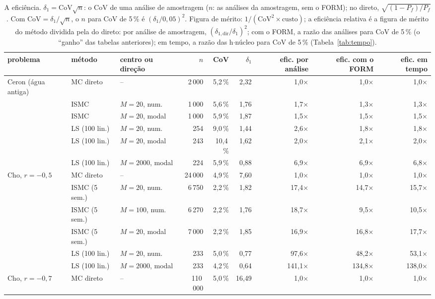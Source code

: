 \begin{landscape}
\begin{table}[H]\centering\footnotesize
\caption{A eficiência. $\delta_1 = \mathrm{CoV}\sqrt{n}$: o CoV de uma análise de amostragem ($n$: as análises da amostragem, sem o FORM); no direto, $\sqrt{(1 - P_f)/P_f}$. Com $\mathrm{CoV} = \delta_1/\sqrt{n}$, o $n$ para CoV de 5\,\% é $(\delta_1/0{,}05)^2$. Figura de mérito: $1/(\mathrm{CoV}^2 \times \text{custo})$; a eficiência relativa é a figura de mérito do método dividida pela do direto: por análise de amostragem, $(\delta_{1,\text{dir}}/\delta_1)^2$; com o FORM, a razão das análises para CoV de 5\,\% (o ``ganho'' das tabelas anteriores); em tempo, a razão das h$\cdot$núcleo para CoV de 5\,\% (Tabela~\ref{tab:tempo}).}\label{tab:efic}
\begin{tabular}{lllrrrrrr}\toprule
problema & método & centro ou direção & $n$ & CoV & $\delta_1$ & efic. por análise & efic. com o FORM & efic. em tempo \\\midrule
Ceron (água antiga) & MC direto & -- & 2\,000 & 5,2\,\% & 2,32 & 1,0× & 1,0× & 1,0× \\
 & ISMC & $M = 20$, num. & 1\,000 & 5,6\,\% & 1,76 & 1,7× & 1,3× & 1,3× \\
 & ISMC & $M = 20$, modal & 1\,000 & 5,9\,\% & 1,87 & 1,5× & 1,5× & 1,5× \\
 & LS (100 lin.) & $M = 20$, num. & 254 & 9,0\,\% & 1,44 & 2,6× & 1,8× & 1,8× \\
 & LS (100 lin.) & $M = 20$, modal & 243 & 10,4\,\% & 1,62 & 2,0× & 2,1× & 2,0× \\
 & LS (100 lin.) & $M = 2000$, modal & 224 & 5,9\,\% & 0,88 & 6,9× & 6,9× & 6,8× \\
\midrule
Cho, $r = -0{,}5$ & MC direto & -- & 24\,000 & 4,9\,\% & 7,60 & 1,0× & 1,0× & 1,0× \\
 & ISMC (5 sem.) & $M = 20$, num. & 6\,750 & 2,2\,\% & 1,82 & 17,4× & 14,7× & 15,7× \\
 & ISMC (5 sem.) & $M = 100$, num. & 6\,270 & 2,2\,\% & 1,76 & 18,7× & 9,5× & 10,5× \\
 & ISMC (5 sem.) & $M = 20$, modal & 7\,000 & 2,2\,\% & 1,85 & 16,9× & 16,8× & 17,7× \\
 & LS (100 lin.) & $M = 20$, num. & 233 & 5,0\,\% & 0,77 & 97,6× & 48,2× & 53,1× \\
 & LS (100 lin.) & $M = 2000$, modal & 233 & 4,2\,\% & 0,64 & 141,1× & 134,8× & 138,0× \\
\midrule
Cho, $r = -0{,}7$ & MC direto & -- & 110\,000 & 5,0\,\% & 16,49 & 1,0× & 1,0× & 1,0× \\

\end{tabular}
\end{table}
\end{landscape}
